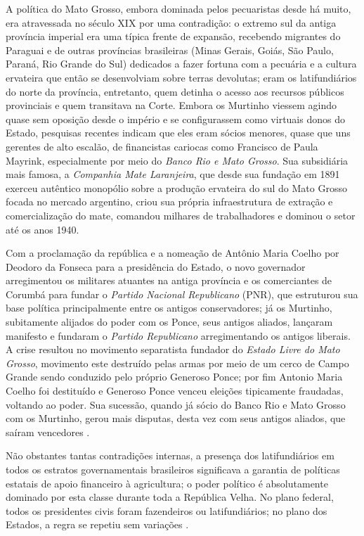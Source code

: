 A política do Mato Grosso, embora dominada pelos pecuaristas desde há muito, era atravessada no século XIX por uma contradição: o extremo sul da antiga província imperial era uma típica frente de expansão, recebendo migrantes do Paraguai e de outras províncias brasileiras (Minas Gerais, Goiás, São Paulo, Paraná, Rio Grande do Sul) dedicados a fazer fortuna com a pecuária e a cultura ervateira que então se desenvolviam sobre terras devolutas; eram os latifundiários do norte da província, entretanto, quem detinha o acesso aos recursos públicos provinciais e quem transitava na Corte. Embora os Murtinho viessem agindo quase sem oposição desde o império e se configurassem como virtuais donos do Estado, pesquisas recentes \cite{queiroz_murtinho_2010} indicam que eles eram sócios menores, quase que uns gerentes de alto escalão, de financistas cariocas como Francisco de Paula Mayrink, especialmente por meio do \textit{Banco Rio e Mato Grosso}. Sua subsidiária mais famosa, a \textit{Companhia Mate Laranjeira}, que desde sua fundação em 1891 exerceu autêntico monopólio sobre a produção ervateira do sul do Mato Grosso focada no mercado argentino, criou sua própria infraestrutura de extração e comercialização do mate, comandou milhares de trabalhadores e dominou o setor até os anos 1940. 

Com a proclamação da república e a nomeação de Antônio Maria Coelho por Deodoro da Fonseca para a presidência do Estado, o novo governador arregimentou os militares atuantes na antiga província e os comerciantes de Corumbá para fundar o \textit{Partido Nacional Republicano} (PNR), que estruturou sua base política principalmente entre os antigos conservadores; já os Murtinho, subitamente alijados do poder com os Ponce, seus antigos aliados, lançaram manifesto e fundaram o \textit{Partido Republicano} arregimentando os antigos liberais. A crise resultou no movimento separatista fundador do \textit{Estado Livre do Mato Grosso}, movimento este destruído pelas armas por meio de um cerco de Campo Grande sendo conduzido pelo próprio Generoso Ponce; por fim Antonio Maria Coelho foi destituído e Generoso Ponce venceu eleições tipicamente fraudadas, voltando ao poder. Sua sucessão, quando já sócio do Banco Rio e Mato Grosso com os Murtinho, gerou mais disputas, desta vez com seus antigos aliados, que saíram vencedores \cite{almeida_matogrosso_2011}. 

Não obstantes tantas contradições internas, a presença dos latifundiários em todos os estratos governamentais brasileiros significava a garantia de políticas estatais de apoio financeiro à agricultura; o poder político é absolutamente dominado por esta classe durante toda a República Velha. No plano federal, todos os presidentes civis foram fazendeiros ou latifundiários; no plano dos Estados, a regra se repetiu sem variações \cite[p.~155]{CARONE1970inst}.



